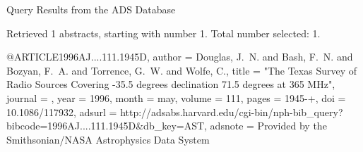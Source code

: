 Query Results from the ADS Database


Retrieved 1 abstracts, starting with number 1.  Total number selected: 1.

@ARTICLE{1996AJ....111.1945D,
   author = {{Douglas}, J.~N. and {Bash}, F.~N. and {Bozyan}, F.~A. and {Torrence}, G.~W. and 
	{Wolfe}, C.},
    title = "{The Texas Survey of Radio Sources Covering -35.5 degrees {\lt} declination {\lt} 71.5 degrees at 365 MHz}",
  journal = {\aj},
     year = 1996,
    month = may,
   volume = 111,
    pages = {1945-+},
      doi = {10.1086/117932},
   adsurl = {http://adsabs.harvard.edu/cgi-bin/nph-bib_query?bibcode=1996AJ....111.1945D&db_key=AST},
  adsnote = {Provided by the Smithsonian/NASA Astrophysics Data System}
}


